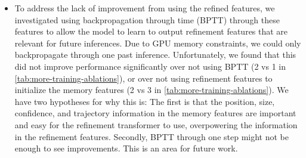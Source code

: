 \begin{itemize}
    the box, confidence score, and trajectory forecasts (the same way we computed the memory proposal features described in \cref{sec:method-arch}).
    However, comparing row 0 to row 3 of \cref{tab:more-training-ablations}, we find that using the refined query features
    does not improve performance over our proposed $\mathbf{Q}^\mathrm{mem}$ described in \cref{sec:method-arch}.
    We think this is because the distribution of these features is changing over training, which
    makes them difficult to learn from.
    \item To address the lack of improvement from using the refined features, we investigated using backpropagation through time (BPTT) through these features
    to allow the model to learn to output refinement features that are relevant for future inferences.
    Due to GPU memory constraints, we could only backpropagate through one past inference.
    Unfortunately, we found that this did not improve performance significantly over not using BPTT (2 vs 1 in \cref{tab:more-training-ablations}),
    or over not using refinement features to initialize the memory features (2 vs 3 in \cref{tab:more-training-ablations}).
    We have two hypotheses for why this is: The first is that the position, size, confidence, and trajectory information in the memory features are important and easy
    for the refinement transformer to use, overpowering the information in the refinement features.
    Secondly, BPTT through one step might not be enough to see improvements.
    This is an area for future work.
\end{itemize}




